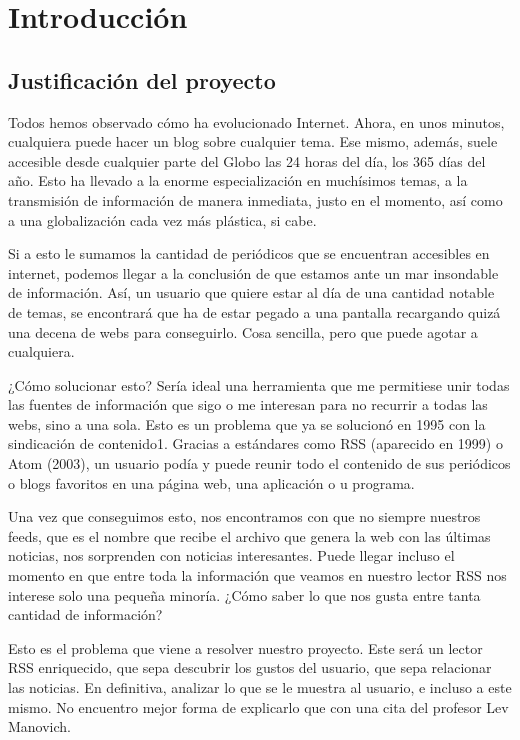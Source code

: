 
\chapter{Introducción}\label{introduccion}
\section{Justificación del proyecto}\label{sec:justificacion}

Todos hemos observado cómo ha evolucionado Internet. Ahora, en unos minutos, cualquiera puede hacer un blog sobre cualquier tema. Ese mismo, además, suele accesible desde cualquier parte del Globo las 24 horas del día, los 365 días del año. Esto ha llevado a la enorme especialización en muchísimos temas, a la transmisión de información de manera inmediata, justo en el momento, así como a una globalización cada vez más plástica, si cabe.

Si a esto le sumamos la cantidad de periódicos que se encuentran accesibles en internet, podemos llegar a la conclusión de que estamos ante un mar insondable de información. Así, un usuario que quiere estar al día de una cantidad notable de temas, se encontrará que ha de estar pegado a una pantalla recargando quizá una decena de webs para conseguirlo. Cosa sencilla, pero que puede agotar a cualquiera.

¿Cómo solucionar esto? Sería ideal una herramienta que me permitiese unir todas las fuentes de información que sigo o me interesan para no recurrir a todas las webs, sino a una sola. Esto es un problema que ya se solucionó en 1995 con la sindicación de contenido1. Gracias a estándares como RSS (aparecido en 1999) o Atom (2003), un usuario podía y puede reunir todo el contenido de sus periódicos o blogs favoritos en una página web, una aplicación o u programa.

Una vez que conseguimos esto, nos encontramos con que no siempre nuestros feeds, que es el nombre que recibe el archivo que genera la web con las últimas noticias, nos sorprenden con noticias interesantes. Puede llegar incluso el momento en que entre toda la información que veamos en nuestro lector RSS nos interese solo una pequeña minoría. ¿Cómo saber lo que nos gusta entre tanta cantidad de información?

Esto es el problema que viene a resolver nuestro proyecto. Este será un lector RSS enriquecido, que sepa descubrir los gustos del usuario, que sepa relacionar las noticias. En definitiva, analizar lo que se le muestra al usuario, e incluso a este mismo. No encuentro mejor forma de explicarlo que con una cita del profesor Lev Manovich.

